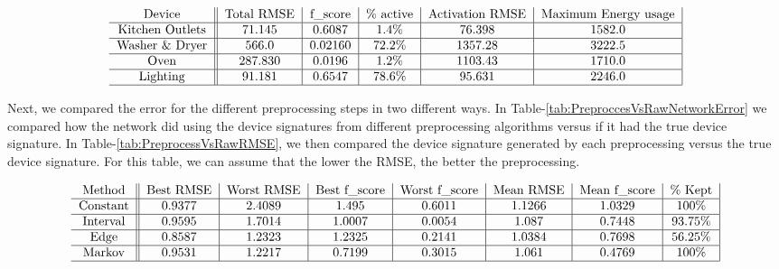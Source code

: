 \documentclass{article}
\begin{document}
\begin{table*}[t]
	\centering
	$$\begin{tabular}{c||c|c|c|c|c|}
	Device & Total RMSE & f\_score & \% active & Activation RMSE & Maximum Energy usage\\
	\hline
	Kitchen Outlets & 71.145 & 0.6087 & 1.4\% & 76.398 & 1582.0  \\ %
	\hline
	Washer \& Dryer & 566.0  & 0.02160  & 72.2\% & 1357.28 & 3222.5  \\ %
	\hline
	Oven & 287.830 & 0.0196 & 1.2\% & 1103.43 & 1710.0  \\ %
	\hline
	Lighting & 91.181 & 0.6547 & 78.6\% & 95.631  & 2246.0  \\ %
	\hline
	\end{tabular}$$
	
	 \label{tab:RawEstimateAfterGenerate} 
\end{table*}

Next, we compared the error for the different preprocessing steps in two different ways.
In Table-\ref{tab:PreproccesVsRawNetworkError} we compared how the network did using the device signatures from different preprocessing algorithms versus if it had the true device signature.
In Table-\ref{tab:PreprocessVsRawRMSE}, we then compared the device signature generated by each preprocessing versus the true device signature.
For this table, we can assume that the lower the RMSE, the better the preprocessing.

\begin{table*}[t]
	\centering
	
	$$\begin{tabular}{c||c|c|c|c|c|c|c|}
	Method & Best RMSE & Worst RMSE & Best f\_score & Worst f\_score & Mean RMSE & Mean f\_score & \% Kept\\
	\hline
	Constant & 0.9377 & 2.4089 & 1.495 & 0.6011 & 1.1266 & 1.0329 & 100\% \\
	\hline
	Interval & 0.9595 & 1.7014 & 1.0007 & 0.0054 & 1.087 & 0.7448 & 93.75\% \\
	\hline
	Edge & 0.8587 & 1.2323 & 1.2325 & 0.2141 & 1.0384 & 0.7698 & 56.25\%  \\
	\hline
	Markov & 0.9531 & 1.2217 & 0.7199 & 0.3015 & 1.061 & 0.4769 & 100\%  \\
	\hline
	\end{tabular}$$
	
	 \label{tab:PreproccesVsRawNetworkError} 
\end{table*}
\end{document}

